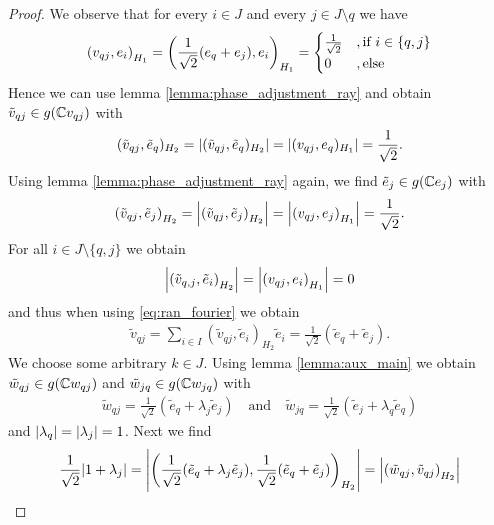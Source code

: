 \begin{proof}
	We observe that for every $i \in J$ and every $j \in J \setminus q$ we have
	\begin{align*}
		{\left ( v_{qj}, e_i \right )}_{H_1} = {\left ( \frac{1}{\sqrt{2}}(e_q + e_j), e_i \right )}_{H_1} =
		\begin{cases}
			\frac{1}{\sqrt{2}} &, \text{if } i \in \{q,j\} \\
			0 &, \text{else}
		\end{cases}
	\end{align*}
	Hence we can use lemma \ref{lemma:phase_adjustment_ray} and obtain $\tilde{v}_{qj} \in g(\mathbb{C} v_{qj})$ with
	\begin{align*}
		(\tilde{v}_{qj}, \tilde{e}_q)_{H_2} = {\left | (\tilde{v}_{qj}, \tilde{e}_q)_{H_2} \right |} = {\left | (v_{qj}, e_q)_{H_1} \right |} = \frac{1}{\sqrt{2}}.
	\end{align*}
	Using lemma \ref{lemma:phase_adjustment_ray} again, we find $\tilde{e}_{j} \in g(\mathbb{C} e_j)$ with
	\begin{align*}
		{\left ( \tilde{v}_{qj}, \tilde{e}_j \right )}_{H_2} = {\left | {\left ( \tilde{v}_{qj}, \tilde{e}_j \right )}_{H_2} \right |} = {\left | {\left ( v_{qj}, e_j \right )}_{H_1} \right |} = \frac{1}{\sqrt{2}}.
	\end{align*}
	For all $i \in J \setminus \{q, j\}$ we obtain
	\begin{align*}
		{\left | {\left ( \tilde{v}_{q,j}, \tilde{e}_i \right )}_{H_2} \right |} = {\left | {\left ( v_{qj}, e_i \right )}_{H_1} \right |} = 0
	\end{align*}
	and thus when using \eqref{eq:ran_fourier} we obtain
	\begin{align*}
		\tilde{v}_{qj} = \sum_{i \in I} (\tilde{v}_{qj}, \tilde{e}_i)_{H_2} \tilde{e}_i = \frac{1}{\sqrt{2}} (\tilde{e}_q + \tilde{e}_j).
	\end{align*}
	We choose some arbitrary $k \in J$. Using lemma \ref{lemma:aux_main} we obtain $\tilde{w}_{qj} \in g(\mathbb{C} w_{qj})$ and $\tilde{w}_{jq} \in g(\mathbb{C} w_{jq})$ with
	\begin{align*}
		\tilde{w}_{qj} = \frac{1}{\sqrt{2}}(\tilde{e}_q + \lambda_j \tilde{e}_j) \quad \text{and} \quad \tilde{w}_{jq} = \frac{1}{\sqrt{2}}(\tilde{e}_j + \lambda_{q} \tilde{e}_q)
	\end{align*}
	and ${\left | \lambda_q \right |} = {\left | \lambda_j \right |} = 1$. Next we find
	\begin{align*}
		\frac{1}{\sqrt{2}}\vbraces{1 + \lambda_j} &= \vbraces{\pbraces{\frac{1}{\sqrt{2}}(\tilde{e}_q + \lambda_j \tilde{e}_j), \frac{1}{\sqrt{2}} (\tilde{e}_q + \tilde{e}_j)}_{H_2}} = \vbraces{\pbraces{\tilde{w}_{qj}, \tilde{v}_{qj}}_{H_2}} \\

\end{align*}
\end{proof}

